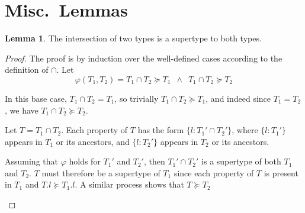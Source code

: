 \documentclass[a4paper]{article}
\theoremstyle{definition}
\theoremstyle{dotless}
\newtheorem{lemma}{Lemma}[section]
\begin{document}
\section{Misc.~Lemmas}
\begin{lemma}\label{typeIntersect}
  The intersection of two types is a supertype to both types.
\end{lemma}
\begin{proof}
  The proof is by induction over the well-defined cases according to the
  definition of $\cap$. Let 
  \begin{equation*}
	\varphi(T_1, T_2) = 
	T_1\cap T_2 \succeq T_1
 	\enspace \land \enspace
 	T_1\cap T_2 \succeq T_2
  \end{equation*}
  \begin{case}[$T_1$ and $T_2$ are not objects, and $T_1 = T_2$]

	In this base case, $T_1 \cap T_2 = T_1$, so trivially 
	$T_1 \cap T_2 \succeq T_1$, and indeed since $T_1 = T_2$, we have 
	$T_1 \cap T_2 \succeq T_2$.

  \end{case}
  \begin{case}

	Let $T = T_1\cap T_2$. Each property of $T$ has the form $\{l : T_1' \cap
	T_2' \}$, where $\{l:T_1'\}$ appears in $T_1$ or its ancestors, and
	$\{l:T_2'\}$ appears in $T_2$ or its ancestors.
	
	Assuming that $\varphi$ holds for $T_1'$ and $T_2'$, then $T_1' \cap T_2'$ is a
	supertype of both $T_1$ and $T_2$. $T$ must therefore be a supertype of
	$T_1$ since each property of $T$ is present in $T_1$ and $T.l \succeq
	T_1.l$. A similar process shows that $T\succeq T_2$

  \end{case}

\end{proof}
\end{document}
